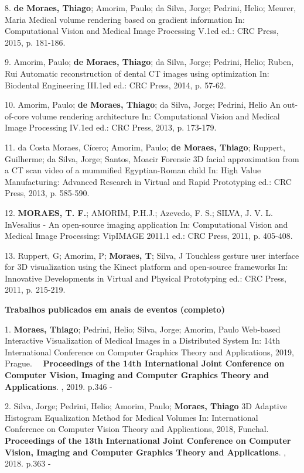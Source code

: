 8. \textbf{de Moraes, Thiago}; Amorim, Paulo; da Silva, Jorge; Pedrini,
Helio; Meurer, Maria
Medical volume rendering based on gradient information In: Computational
Vision and Medical Image Processing V.1ed ed.: CRC Press, 2015, p.
181-186.

9. Amorim, Paulo; \textbf{de Moraes, Thiago}; da Silva, Jorge; Pedrini,
Helio; Ruben, Rui
Automatic reconstruction of dental CT images using optimization In:
Biodental Engineering III.1ed ed.: CRC Press, 2014, p. 57-62.

10. Amorim, Paulo; \textbf{de Moraes, Thiago}; da Silva, Jorge; Pedrini,
Helio
An out-of-core volume rendering architecture In: Computational Vision
and Medical Image Processing IV.1ed ed.: CRC Press, 2013, p. 173-179.

11. da Costa Moraes, Cícero; Amorim, Paulo; \textbf{de Moraes, Thiago};
Ruppert, Guilherme; da Silva, Jorge; Santos, Moacir
Forensic 3D facial approximation from a CT scan video of a mummified
Egyptian-Roman child In: High Value Manufacturing: Advanced Research in
Virtual and Rapid Prototyping ed.: CRC Press, 2013, p. 585-590.

12. \textbf{MORAES, T. F.}; AMORIM, P.H.J.; Azevedo, F. S.; SILVA, J. V.
L.
InVesalius - An open-source imaging application In: Computational Vision
and Medical Image Processing: VipIMAGE 2011.1 ed.: CRC Press, 2011, p.
405-408.

13. Ruppert, G; Amorim, P; \textbf{Moraes, T}; Silva, J
Touchless gesture user interface for 3D visualization using the Kinect
platform and open-source frameworks In: Innovative Developments in
Virtual and Physical Prototyping ed.: CRC Press, 2011, p. 215-219.

\textbf{Trabalhos publicados em anais de eventos (completo)}

1. \textbf{Moraes, Thiago}; Pedrini, Helio; Silva, Jorge; Amorim, Paulo
Web-based Interactive Visualization of Medical Images in a Distributed
System In: 14th International Conference on Computer Graphics Theory and
Applications, 2019, Prague.
    \textbf{Proceedings of the 14th International Joint Conference on
Computer Vision, Imaging and Computer Graphics Theory and Applications}.
, 2019. p.346 -

2. Silva, Jorge; Pedrini, Helio; Amorim, Paulo; \textbf{Moraes, Thiago}
3D Adaptive Histogram Equalization Method for Medical Volumes In:
International Conference on Computer Vision Theory and Applications,
2018, Funchal.
    \textbf{Proceedings of the 13th International Joint Conference on
Computer Vision, Imaging and Computer Graphics Theory and Applications}.
, 2018. p.363 -

